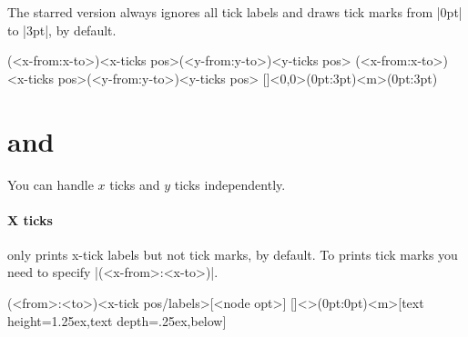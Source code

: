 The starred version \icmd{\tzticks*} always ignores all tick labels and draws tick marks from |0pt| to |3pt|, by default.

\begin{tzdef}{}
\tzticks*(<x-from:x-to>){<x-ticks pos>}(<y-from:y-to>){<y-ticks pos>}
         (<x-from:x-to>){<x-ticks pos>}(<y-from:y-to>){<y-ticks pos>}
  []<0,0>(0pt:3pt){<m>}(0pt:3pt){}
\end{tzdef}

\begin{tzcode}{.3}
{}
\end{tzcode}

\begin{tzcode}{.4}
\end{tzcode}


\section{\protect\cmd{\tzticksx(*)} and \protect\cmd{\tzticksy(*)}}
\label{s:tzticksx}

You can handle $x$ ticks and $y$ ticks independently.

\paragraph{X ticks}

\icmd{\tzticksx} only prints x-tick labels but not tick marks, by default.
To prints tick marks you need to specify |(<x-from>:<x-to>)|.

\begin{tzdef}{}
(<from>:<to>){<x-tick pos/labels>}[<node opt>]
  []<>(0pt:0pt){<m>}[text height=1.25ex,text depth=.25ex,below]
\end{tzdef}


